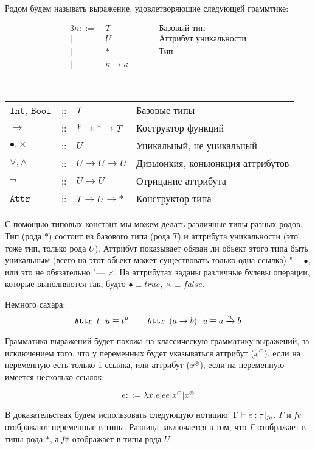 \begin{definition}[Род]
	Родом будем называть выражение, удовлетворяющие следующей граммтике:
	\begin{bnf}
	\begin{alignat*}{3}
		\kappa ::= &\ T && \qquad \text{Базовый тип} \\
				 | &\ U && \qquad \text{Аттрибут уникальности} \\
				 | &\ * && \qquad \text{Тип} \\
				 | &\ \kappa \rightarrow \kappa
	\end{alignat*}
	\end{bnf}
\end{definition}
\begin{definition}\ \\
	\begin{tabular}{llll}
		$\mathtt{Int}$, $\mathtt{Bool}$ & :: & $T$ & Базовые типы \\
		$\rightarrow$                   & :: & $* \rightarrow * \rightarrow T$ & Коструктор функций \\
		$\bullet, \times$               & :: & $U$ & Уникальный, не уникальный \\
		$\vee, \wedge$                  & :: & $U \rightarrow U \rightarrow U$ & Дизьюнкия, коньюнкция аттрибутов \\
		$\neg$                          & :: & $U \rightarrow U$ & Отрицание аттрибута \\
		$\mathtt{Attr}$                 & :: & $T \rightarrow U \rightarrow *$ & Конструктор типа
	\end{tabular}
\end{definition}
С помощью типовых констант мы можем делать различные типы разных родов. 
Тип (рода $*$) состоит из базового типа (рода $T$) и аттрибута уникальности (это тоже тип, только рода $U$). 
Аттрибут показывает обязан ли обьект этого типа быть уникальным (всего на этот обьект может существовать только одна ссылка) "--- $\bullet$,
или это не обязательно "--- $\times$.
На аттрибутах заданы различные булевы операции, которые выполняются так, будто $\bullet \equiv true$, $\times \equiv false$.

Немного сахара:
\[
	\mathinner{\mathtt{Attr}}~t~~u \equiv t^u \qquad \mathinner{\mathtt{Attr}}~(a \rightarrow b)~~u \equiv a \xrightarrow{u} b
\]

Грамматика выражений будет похожа на классическую грамматику выражений, за исключением того,
что у переменных будет указываться аттрибут ($x^\odot$), если на переменную есть только 1 ссылка,
или аттрибут ($x^\otimes$), если на переменную имеется несколько ссылок.
\begin{bnf}
\[
	e ::= \lambda x.e | ee | x^\odot | x^\otimes
\]
\end{bnf}%
В доказательствах будем использовать следующую нотацию: $\Gamma \vdash e : \tau |_{\mathit{fv}}$.
$\Gamma$ и $\mathit{fv}$ отображают переменные в типы. 
Разница заключается в том, что $\Gamma$ отображает в типы рода $*$,
а $\mathit{fv}$ отображает в типы рода $U$.

